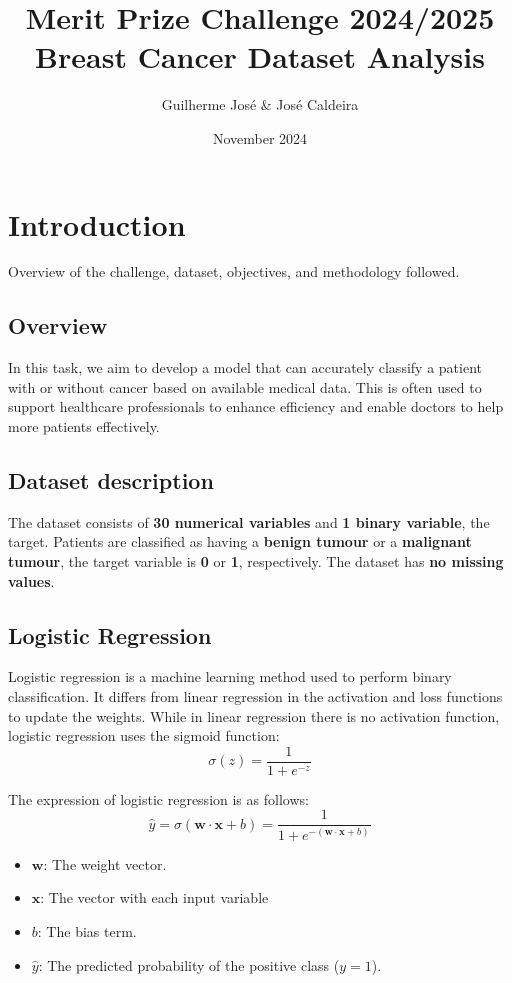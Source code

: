 \documentclass[a4paper,12pt]{article}
\title{Merit Prize Challenge 2024/2025 \\ \vspace{0.5cm} \large Breast Cancer Dataset Analysis}
\author{Guilherme José & José Caldeira}
\date{November 2024}
\begin{document}
\maketitle
\tableofcontents
\newpage

\section{Introduction}
\label{sec:introduction}
Overview of the challenge, dataset, objectives, and methodology followed.

\subsection{Overview}
In this task, we aim to develop a model that can accurately classify a patient with or without cancer based on available medical data. This is often used to support healthcare professionals to enhance efficiency and enable doctors to help more patients effectively.
\subsection{Dataset description}
The dataset consists of \textbf{30 numerical variables} and \textbf{1 binary variable}, the target. Patients are classified as having a \textbf{benign tumour} or a \textbf{malignant tumour}, the target variable is \textbf{0} or \textbf{1}, respectively. The dataset has \textbf{no missing values}.
\subsection{Logistic Regression}
Logistic regression is a machine learning method used to perform binary classification. It differs from linear regression in the activation and loss functions to update the weights. While in linear regression there is no activation function, logistic regression uses the sigmoid function:
\[ \sigma(z) = \frac{1}{1 + e^{-z}} \]


The expression of logistic regression is as follows:
\[
\hat{y} = \sigma(\mathbf{w} \cdot \mathbf{x} + b) =\frac{1}{1 + e^{-(\mathbf{w} \cdot \mathbf{x} + b)}}
\]

\begin{itemize}
    \item \(\mathbf{w}\): The weight vector.
    \item \(\mathbf{x}\): The vector with each input variable
    \item \(b\): The bias term.
    \item \(\hat{y}\): The predicted probability of the positive class (\(y=1\)). 
\end{itemize}
\end{document}
